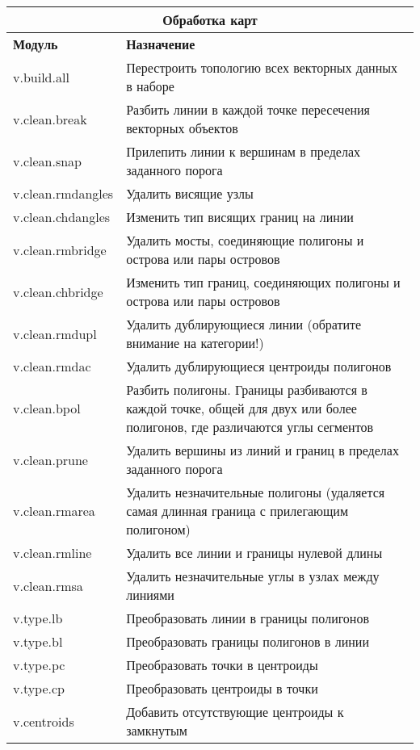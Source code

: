 {\renewcommand{\arraystretch}{0.7}
\begin{table}[H]
\centering
 \begin{tabular}{|p{3cm}|p{11cm}|}
  \hline \multicolumn{2}{|c|}{\textbf{Обработка карт}} \\
  \hline \textbf{Модуль} & \textbf{Назначение} \\
  \hline v.build.all & Перестроить топологию всех векторных данных в
  наборе \\
  \hline v.clean.break & Разбить линии в каждой точке пересечения
  векторных объектов \\
  \hline v.clean.snap & Прилепить линии к вершинам в пределах заданного
  порога \\
  \hline v.clean.rmdangles & Удалить висящие узлы \\
  \hline v.clean.chdangles & Изменить тип висящих границ на линии \\
  \hline v.clean.rmbridge & Удалить мосты, соединяющие полигоны и
  острова или пары островов \\
  \hline v.clean.chbridge & Изменить тип границ, соединяющих полигоны
  и острова или пары островов \\
  \hline v.clean.rmdupl & Удалить дублирующиеся линии (обратите внимание
  на категории!) \\
  \hline v.clean.rmdac & Удалить дублирующиеся центроиды полигонов \\
  \hline v.clean.bpol & Разбить полигоны. Границы разбиваются в каждой
  точке, общей для двух или более полигонов, где различаются углы сегментов \\
  \hline v.clean.prune & Удалить вершины из линий и границ в пределах
  заданного порога \\
  \hline v.clean.rmarea & Удалить незначительные полигоны (удаляется самая
  длинная граница с прилегающим полигоном) \\
  \hline v.clean.rmline & Удалить все линии и границы нулевой длины \\
  \hline v.clean.rmsa & Удалить незначительные углы в узлах между линиями \\
  \hline v.type.lb & Преобразовать линии в границы полигонов \\
  \hline v.type.bl & Преобразовать границы полигонов в линии \\
  \hline v.type.pc & Преобразовать точки в центроиды \\
  \hline v.type.cp & Преобразовать центроиды в точки \\
  \hline v.centroids & Добавить отсутствующие центроиды к замкнутым

\end{tabular}
\end{table}}
